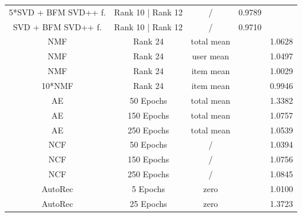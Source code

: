 \documentclass[10pt,conference,compsocconf]{IEEEtran}
\begin{document}
\begin{table}
{\begin{tabular}{|| c | c | c | c | c ||}
            5*SVD + BFM SVD++ f. & Rank 10 | Rank 12                     & /                       & 0.9789                 &                         \\
            SVD + BFM SVD++ f.   & Rank 10 | Rank 12                     & /                       & 0.9710                 &                         \\
            \hline
            NMF                  & Rank 24                               & total mean              &                        & 1.0628                  \\
            NMF                  & Rank 24                               & user mean               &                        & 1.0497                  \\
            NMF                  & Rank 24                               & item mean               &                        & 1.0029                  \\
            10*NMF               & Rank 24                               & item mean               &                        & 0.9946                  \\
            \hline
            AE                   & 50 Epochs                             & total mean              &                        & 1.3382                  \\
            AE                   & 150 Epochs                            & total mean              &                        & 1.0757                  \\
            AE                   & 250 Epochs                            & total mean              &                        & 1.0539                  \\
            \hline
            NCF                  & 50 Epochs                             & /                       &                        & 1.0394                  \\
            NCF                  & 150 Epochs                            & /                       &                        & 1.0756                  \\
            NCF                  & 250 Epochs                            & /                       &                        & 1.0845                  \\
            \hline
            AutoRec              & 5 Epochs                              & zero                    &                        & 1.0100                  \\
            AutoRec              & 25 Epochs                             & zero                    &                        & 1.3723                  \\

\end{tabular}}
\end{table}
\end{document}
